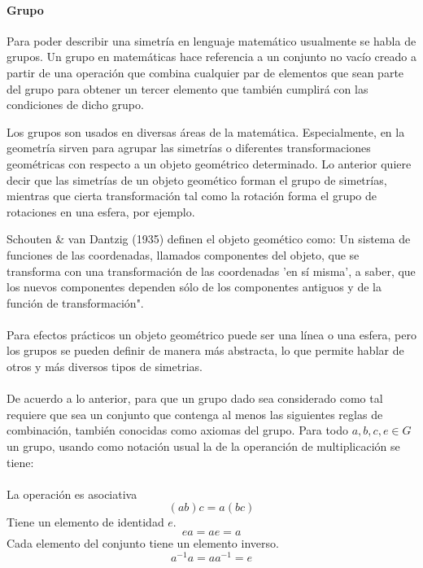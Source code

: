 \documentclass[12pt,letterpaper,final, openany]{scrbook}
\begin{document}
\paragraph{Grupo}

Para poder describir una simetría en lenguaje matemático usualmente se habla de grupos. Un grupo en matemáticas hace referencia a un conjunto no vacío creado a partir de una operación que combina cualquier par de elementos que sean parte del grupo para obtener un tercer elemento que también cumplirá con las condiciones de dicho grupo.

Los grupos son usados en diversas áreas de la matemática. Especialmente, en la geometría sirven para agrupar las simetrías o diferentes transformaciones geométricas con respecto a un objeto geométrico determinado. Lo anterior quiere decir que las simetrías de un objeto geomético forman el grupo de simetrías, mientras que cierta transformación tal como la rotación forma el grupo de rotaciones en una esfera, por ejemplo. 

Schouten \& van Dantzig (1935) definen el objeto geomético como:
    Un sistema de funciones de las coordenadas, llamados componentes del objeto, que se transforma con una transformación de las coordenadas 'en sí misma', a saber, que los nuevos componentes dependen sólo de los componentes antiguos y de la función de transformación".
\\
\\
Para efectos prácticos un objeto geométrico puede ser una línea o una esfera, pero los grupos se pueden definir de manera más abstracta, lo que permite hablar de otros y más diversos tipos de simetrias. 
\\
\\
De acuerdo a lo anterior, para que un grupo dado sea considerado como tal requiere que sea un conjunto que contenga al menos las siguientes reglas de combinación, también conocidas como axiomas del grupo. Para todo $a,b,c,e \in G$ un grupo, usando como notación usual la de la operanción de multiplicación se tiene:
\\
\\
La operación es asociativa
\begin{equation}
(ab)c=a(bc)
\end{equation}
Tiene un elemento de identidad $e$.
\begin{equation}
ea=ae=a
\end{equation}
Cada elemento del conjunto tiene un elemento inverso.
\begin{equation}
a^{-1}a=aa^{-1}=e
\end{equation}
\end{document}
